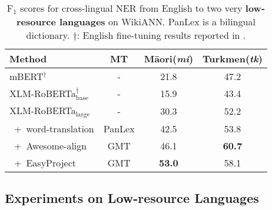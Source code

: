\documentclass[11pt,dvipsnames]{article}
\begin{document}
\renewcommand{\arraystretch}{1.2}
\begin{table}[pt!]
\centering
\small
\setlength{\tabcolsep}{1pt}\begin{tabular}{lccc}
\toprule
Method & MT & M\=aori(\textit{mi}) & Turkmen(\textit{tk})\\
\midrule
mBERT$^{\dagger}$ & - & 21.8 & 47.2\\
XLM-RoBERTa$_{\text{base}}^{\dagger}$ & - &15.9 & 43.4\\
\midrule
XLM-RoBERTa$_{\text{large}}$  & - & 30.3 &52.2 \\
~+~word-translation & PanLex&42.5&53.8\\
~+~Awesome-align & GMT & 46.1 & \textbf{60.7} \\
~+~EasyProject & GMT & \textbf{53.0} & 58.1\\
\bottomrule
\end{tabular}
\vspace{-5pt}
\caption{F$_1$ scores for cross-lingual NER from English to two very \textbf{low-resource languages} on WikiANN. PanLex is a bilingual dictionary. $\dagger$: English fine-tuning results reported in \citep{pfeiffer2020madx}.}
\label{table:low}
\vspace{-15pt}
\end{table}



\subsection{Experiments on Low-resource Languages}
\label{sec:low}
\end{document}
